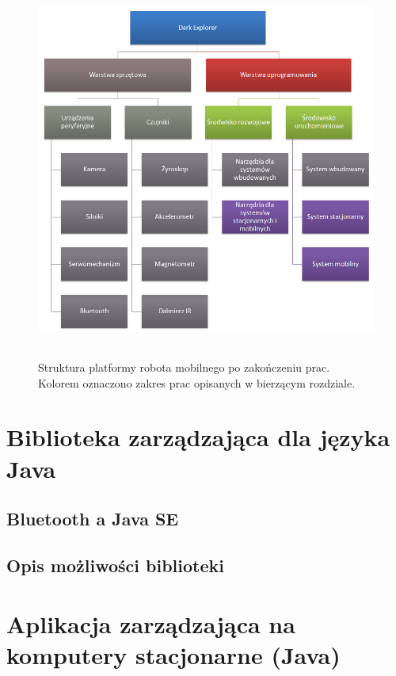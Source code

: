 \begin{figure}[!ht]
 \centering
 \includegraphics[height=125mm]{../images/ch03/dark_explorer_platform_ide_stac_mob.png}
 \caption{Struktura platformy robota mobilnego po zakończeniu prac. Kolorem oznaczono zakres prac opisanych w bierzącym rozdziale.}
 \label{fig:DarkExplorerPlatformIDE}
\end{figure}

\section{Biblioteka zarządzająca dla języka Java}
\subsection{Bluetooth a Java SE}
\subsection{Opis możliwości biblioteki}
\section{Aplikacja zarządzająca na komputery stacjonarne (Java)}